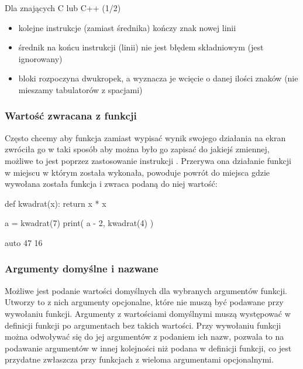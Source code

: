 \begin{ProTip}{Dla znających C lub C++ (1/2) }
\begin{itemize}
	\item kolejne instrukcje (zamiast średnika) kończy znak nowej linii
	\item średnik na końcu instrukcji (linii) nie jest błędem składniowym (jest ignorowany)
	\item bloki rozpoczyna dwukropek, a wyznacza je wcięcie o danej ilości znaków (nie mieszamy tabulatorów z spacjami)
\end{itemize}
\end{ProTip}

\subsubsection{Wartość zwracana z funkcji}

Często chcemy aby funkcja zamiast wypisać wynik swojego działania na ekran zwróciła go w taki sposób aby można było go zapisać do jakiejś zmiennej,
możliwe to jest poprzez zastosowanie instrukcji . Przerywa ona działanie funkcji w miejscu w którym została wykonała,
powoduje powrót do miejsca gdzie wywołana została funkcja i zwraca podaną do niej wartość:

\begin{CodeFrame}[python]{.5\textwidth}
def kwadrat(x):
  return x * x

a = kwadrat(7)
print( a - 2, kwadrat(4) )
\end{CodeFrame}
\begin{CodeFrame}{auto}
47 16
\end{CodeFrame}

\vspace{-13pt}

\subsubsection{Argumenty domyślne i nazwane }

Możliwe jest podanie wartości domyślnych dla wybranych argumentów funkcji. Utworzy to z nich argumenty opcjonalne, które nie muszą być podawane przy wywołaniu funkcji.
Argumenty z wartościami domyślnymi muszą występować w definicji funkcji po argumentach bez takich wartości.
Przy wywołaniu funkcji można odwoływać się do jej argumentów z podaniem ich nazw, pozwala to na podawanie argumentów w innej kolejności niż podana w definicji funkcji,
co jest przydatne zwłaszcza przy funkcjach z wieloma argumentami opcjonalnymi.

